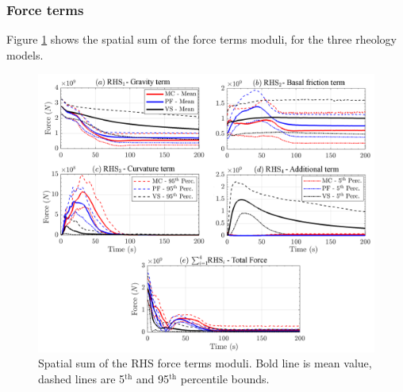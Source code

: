 \documentclass{article}
\begin{document}
\subsubsection{Force terms}
Figure \ref{fig:Colima-F-spatial} shows the spatial sum of the force terms moduli, for the three rheology models.
\begin{figure}[H]
        \centering
        \includegraphics[width=1\textwidth]{BAF_VolcanDeColima/AveragedMeasurments/ForcesColima.png}
        \caption{Spatial sum of the RHS force terms moduli. Bold line is mean value, dashed lines are 5$^{\mathrm{th}}$ and 95$^{\mathrm{th}}$ percentile bounds.}
        \label{fig:Colima-F-spatial}
\end{figure}
\end{document}
